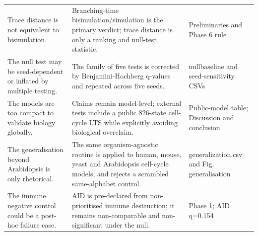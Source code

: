 \begin{longtable}{@{}p{4.2cm}p{6.7cm}p{3.1cm}@{}}
Trace distance is not equivalent to bisimulation. & Branching-time bisimulation/simulation is the primary verdict; trace distance is only a ranking and null-test statistic. & Preliminaries and Phase 6 rule \\
The null test may be seed-dependent or inflated by multiple testing. & The family of five tests is corrected by Benjamini-Hochberg q-values and repeated across five seeds. & nullbaseline and seed-sensitivity CSVs \\
The models are too compact to validate biology globally. & Claims remain model-level; external tests include a public 826-state cell-cycle LTS while explicitly avoiding biological overclaim. & Public-model table; Discussion and conclusion \\
The generalisation beyond Arabidopsis is only rhetorical. & The same organism-agnostic routine is applied to human, mouse, yeast and Arabidopsis cell-cycle models, and rejects a scrambled same-alphabet control. & generalization.csv and Fig. generalisation \\
The immune negative control could be a post-hoc failure case. & AID is pre-declared from non-prioritised immune destruction; it remains non-comparable and non-significant under the null. & Phase 1; AID q=0.154 \\
\bottomrule
\end{longtable}
